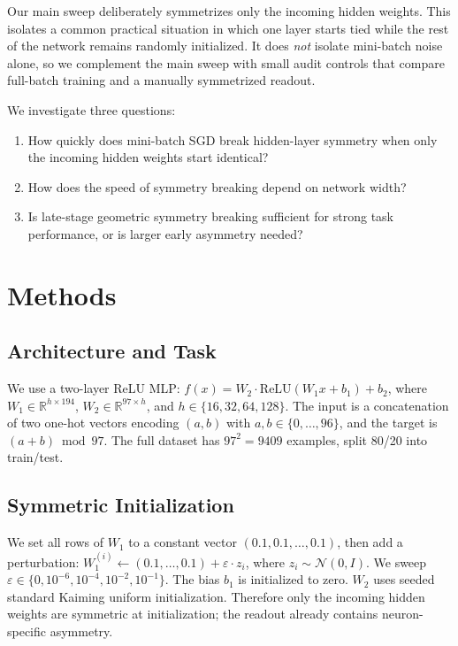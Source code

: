 \documentclass[11pt,a4paper]{article}
\begin{document}
Our main sweep deliberately symmetrizes only the incoming hidden weights.
This isolates a common practical situation in which one layer starts tied while the rest of the network remains randomly initialized.
It does \emph{not} isolate mini-batch noise alone, so we complement the main sweep with small audit controls that compare full-batch training and a manually symmetrized readout.

We investigate three questions:
\begin{enumerate}
    \item How quickly does mini-batch SGD break hidden-layer symmetry when only the incoming hidden weights start identical?
    \item How does the speed of symmetry breaking depend on network width?
    \item Is late-stage geometric symmetry breaking sufficient for strong task performance, or is larger early asymmetry needed?
\end{enumerate}

\section{Methods}

\subsection{Architecture and Task}

We use a two-layer ReLU MLP: $f(x) = W_2 \cdot \text{ReLU}(W_1 x + b_1) + b_2$, where $W_1 \in \mathbb{R}^{h \times 194}$, $W_2 \in \mathbb{R}^{97 \times h}$, and $h \in \{16, 32, 64, 128\}$.
The input is a concatenation of two one-hot vectors encoding $(a, b)$ with $a, b \in \{0, \ldots, 96\}$, and the target is $(a + b) \bmod 97$.
The full dataset has $97^2 = 9409$ examples, split 80/20 into train/test.

\subsection{Symmetric Initialization}

We set all rows of $W_1$ to a constant vector $(0.1, 0.1, \ldots, 0.1)$, then add a perturbation: $W_1^{(i)} \leftarrow (0.1, \ldots, 0.1) + \varepsilon \cdot z_i$, where $z_i \sim \mathcal{N}(0, I)$.
We sweep $\varepsilon \in \{0, 10^{-6}, 10^{-4}, 10^{-2}, 10^{-1}\}$.
The bias $b_1$ is initialized to zero.
$W_2$ uses seeded standard Kaiming uniform initialization.
Therefore only the incoming hidden weights are symmetric at initialization; the readout already contains neuron-specific asymmetry.
\end{document}

